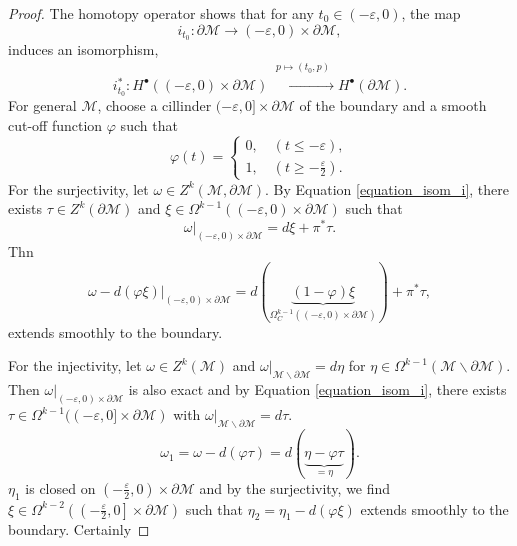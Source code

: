 \documentclass[8pt]{article}
\newcommand{\M}[0]{\mathcal{M}}
\begin{document}
\begin{proof}
  The homotopy operator shows that for any $t_0\in(-\varepsilon,0)$, the map 
  \begin{equation*}
    i_{t_0}:\partial\M\to(-\varepsilon,0)\times\partial\M,
  \end{equation*}
  induces an isomorphism,
  \begin{equation*}
    i_{t_0}^*:H^\bullet((-\varepsilon,0)\times\partial\M)\stackrel{\substack{p\mapsto(t_0,p)\\\:}}{\to}H^\bullet(\partial\M).\tag{$\ast$}\label{equation_isom_i}
  \end{equation*}
  For general $\M$, choose a cillinder $(-\varepsilon,0]\times\partial\M$ of the boundary and a smooth cut-off function $\varphi$ such that 
  \begin{equation*}
    \varphi(t)=\begin{cases}
      0,\quad(t\leq-\varepsilon),\\
      1,\quad(t\geq-{\frac \varepsilon 2}).
    \end{cases}
  \end{equation*}
  For the surjectivity, let $\omega\in Z^k(\M,\partial\M)$. By Equation \eqref{equation_isom_i}, there exists $\tau\in Z^k(\partial\M)$ and $\xi\in\Omega^{k-1}((-\varepsilon,0)\times\partial\M)$ such that 
  \begin{equation*}
    \omega|_{(-\varepsilon,0)\times\partial\M}=d\xi+\pi^*\tau.
  \end{equation*}
  Thn 
  \begin{equation*}
    \omega-d(\varphi\xi)|_{(-\varepsilon,0)\times\partial\M} = d(\underbrace{(1-\varphi)\xi}_{\Omega^{k-1}_C((-\varepsilon,0)\times\partial\M)})+\pi^*\tau,
  \end{equation*}
  extends smoothly to the boundary.
  \par For the injectivity, let $\omega\in Z^k(\M)$ and $\omega|_{\M\backslash\partial\M}=d\eta$ for $\eta\in\Omega^{k-1}(\M\backslash\partial\M)$. Then $\omega|_{(-\varepsilon,0)\times\partial\M}$ is also exact and by Equation \eqref{equation_isom_i}, there exists $\tau\in\Omega^{k-1}((-\varepsilon,0]\times\partial\M)$ with $\omega|_{\M\backslash\partial\M}=d\tau$.
  \begin{equation*}
    \omega_1 = \omega-d(\varphi\tau) = d(\underbrace{\eta-\varphi\tau}_{=\eta}).
  \end{equation*}
  $\eta_1$ is closed on $\left(-{\frac \varepsilon 2},0\right)\times\partial\M$ and by the surjectivity, we find $\xi\in\Omega^{k-2}\left(\left(-{\frac \varepsilon 2},0\right]\times\partial\M\right)$ such that $\eta_2 = \eta_1-d(\varphi\xi)$ extends smoothly to the boundary. Certainly 

\end{proof}
\end{document}
